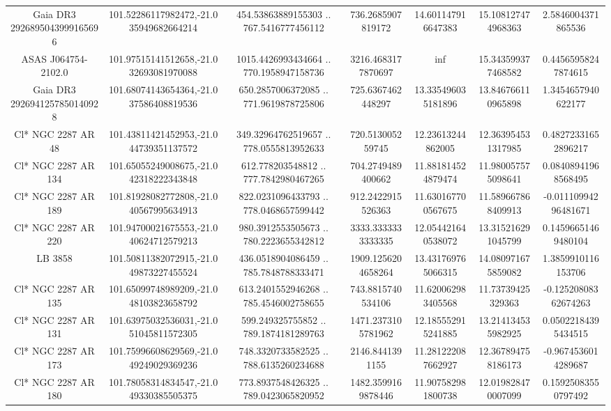 \begin{table}
\begin{tabular}{ccccccc}
Gaia DR3 2926895043999165696 & 101.52286117982472,-21.035949682664214 & 454.53863889155303 .. 767.5416777456112 & 736.2685907819172 & 14.601147916647383 & 15.108127474968363 & 2.5846004371865536 \\
ASAS J064754-2102.0 & 101.97515141512658,-21.032693081970088 & 1015.4426993434664 .. 770.1958947158736 & 3216.4683177870697 & inf & 15.343599377468582 & 0.44565958247874615 \\
Gaia DR3 2926941257850140928 & 101.68074143654364,-21.037586408819536 & 650.2857006372085 .. 771.9619878725806 & 725.6367462448297 & 13.335496035181896 & 13.846766110965898 & 1.3454657940622177 \\
Cl* NGC 2287     AR      48 & 101.43811421452953,-21.044739351137572 & 349.32964762519657 .. 778.0555813952633 & 720.513005259745 & 12.23613244862005 & 12.363954531317985 & 0.48272331652896217 \\
Cl* NGC 2287     AR     134 & 101.65055249008675,-21.042318222343848 & 612.778203548812 .. 777.7842980467265 & 704.2749489400662 & 11.881814524879474 & 11.980057575098641 & 0.08408941968568495 \\
Cl* NGC 2287     AR     189 & 101.81928082772808,-21.040567995634913 & 822.0231096433793 .. 778.0468657599442 & 912.2422915526363 & 11.630167700567675 & 11.589667868409913 & -0.01110994296481671 \\
Cl* NGC 2287     AR     220 & 101.94700021675553,-21.040624712579213 & 980.3912553505673 .. 780.2223655342812 & 3333.3333333333335 & 12.054421640538072 & 13.315216291045799 & 0.14596651469480104 \\
LB  3858 & 101.50811382072915,-21.049873227455524 & 436.0518904086459 .. 785.7848788333471 & 1909.1256204658264 & 13.431769765066315 & 14.080971675859082 & 1.3859910116153706 \\
Cl* NGC 2287     AR     135 & 101.65099748989209,-21.048103823658792 & 613.2401552946268 .. 785.4546002758655 & 743.8815740534106 & 11.620062983405568 & 11.73739425329363 & -0.12520808362674263 \\
Cl* NGC 2287     AR     131 & 101.63975032536031,-21.051045811572305 & 599.249325755852 .. 789.1874181289763 & 1471.2373105781962 & 12.185552915241885 & 13.214134535982925 & 0.05022184395434515 \\
Cl* NGC 2287     AR     173 & 101.75996608629569,-21.049249029369236 & 748.3320733582525 .. 788.6135260234688 & 2146.8441391155 & 11.281222087662927 & 12.367894758186173 & -0.9674536014289687 \\
Cl* NGC 2287     AR     180 & 101.78058314834547,-21.049330385505375 & 773.8937548426325 .. 789.0423065820952 & 1482.3599169878446 & 11.907582981800738 & 12.019828470007099 & 0.15925083550797492 \\

\end{tabular}
\end{table}
